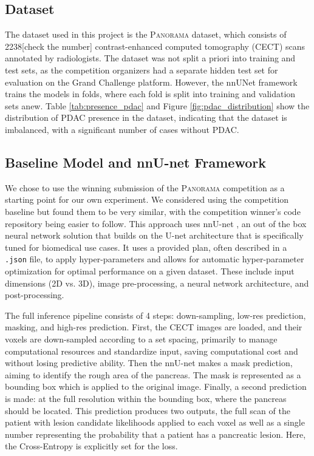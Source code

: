 \documentclass[conference]{IEEEtran}
\begin{document}
\subsection{Dataset}
The dataset used in this project is the \textsc{Panorama} dataset, which consists of 2238[check the number] contrast-enhanced computed tomography (CECT) scans annotated by radiologists. The dataset was not split a priori into training and test sets, as the competition organizers had a separate hidden test set for evaluation on the Grand Challenge platform. However, the nnUNet framework trains the models in folds, where each fold is split into training and validation sets anew. Table \ref{tab:presence_pdac} and Figure \ref{fig:pdac_distribution} show the distribution of PDAC presence in the dataset, indicating that the dataset is imbalanced, with a significant number of cases without PDAC.
\subsection{Baseline Model and nnU-net Framework} 
We chose to use the winning submission of the \textsc{Panorama} competition as a starting point for our own experiment. We considered using the competition baseline but found them to be very similar, with the competition winner's code repository being easier to follow. This approach uses nnU-net \cite{b1}, an out of the box neural network solution that builds on the U-net architecture that is specifically tuned for biomedical use cases. It uses a provided plan, often described in a \texttt{.json} file, to apply hyper-parameters and allows for automatic hyper-parameter optimization for optimal performance on a given dataset. These include input dimensions (2D vs. 3D), image pre-processing, a neural network architecture, and post-processing.

The full inference pipeline consists of 4 steps: down-sampling, low-res prediction, masking, and high-res prediction. First, the CECT images are loaded, and their voxels are down-sampled according to a set spacing, primarily to manage computational resources and standardize input, saving computational cost and without losing predictive ability. Then the nnU-net makes a mask prediction, aiming to identify the rough area of the pancreas. The mask is represented as a bounding box which is applied to the original image. Finally, a second prediction is made: at the full resolution within the bounding box, where the pancreas should be located. This prediction produces two outputs, the full scan of the patient with lesion candidate likelihoods applied to each voxel as well as a single number representing the probability that a patient has a pancreatic lesion. Here, the Cross-Entropy is explicitly set for the loss.
\end{document}
